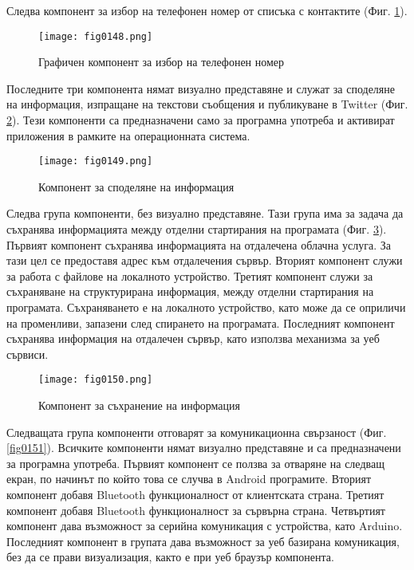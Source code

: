 Следва компонент за избор на телефонен номер от списъка с контактите (Фиг. \ref{fig0148}).

\begin{figure}[H]
  \centering
  \texttt{[image: fig0148.png]}
  \caption{Графичен компонент за избор на телефонен номер}
\label{fig0148}
\end{figure}

Последните три компонента нямат визуално представяне и служат за споделяне на информация, изпращане на текстови съобщения и публикуване в Twitter (Фиг. \ref{fig0149}). Тези компоненти са предназначени само за програмна употреба и активират приложения в рамките на операционната система.

\begin{figure}[H]
  \centering
  \texttt{[image: fig0149.png]}
  \caption{Компонент за споделяне на информация}
\label{fig0149}
\end{figure}

Следва група компоненти, без визуално представяне. Тази група има за задача да съхранява информацията между отделни стартирания на програмата (Фиг. \ref{fig0150}). Първият компонент съхранява информацията на отдалечена облачна услуга. За тази цел се предоставя адрес към отдалечения сървър. Вторият компонент служи за работа с файлове на локалното устройство. Третият компонент служи за съхраняване на структурирана информация, между отделни стартирания на програмата. Съхраняването е на локалното устройство, като може да се оприличи на променливи, запазени след спирането на програмата. Последният компонент съхранява информация на отдалечен сървър, като използва механизма за уеб сървиси. 

\begin{figure}[H]
  \centering
  \texttt{[image: fig0150.png]}
  \caption{Компонент за съхранение на информация}
\label{fig0150}
\end{figure}

Следващата група компоненти отговарят за комуникационна свързаност (Фиг. \ref{fig0151}). Всичките компоненти нямат визуално представяне и са предназначени за програмна употреба. Първият компонент се ползва за отваряне на следващ екран, по начинът по който това се случва в Android програмите. Вторият компонент добавя Bluetooth функционалност от клиентската страна. Третият компонент добавя Bluetooth функционалност за сървърна страна. Четвъртият компонент дава възможност за серийна комуникация с устройства, като Arduino. Последният компонент в групата дава възможност за уеб базирана комуникация, без да се прави визуализация, както е при уеб браузър компонента. 

